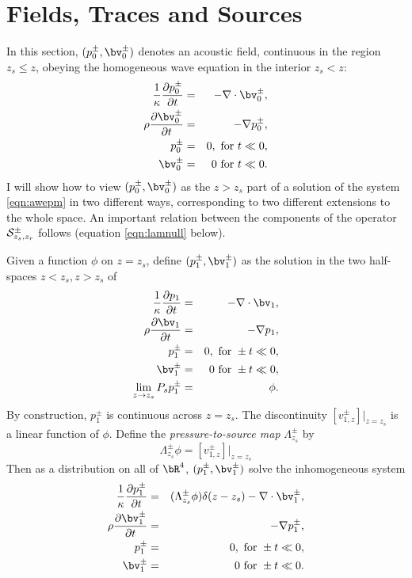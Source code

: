 \section{Fields, Traces and Sources}
In this section, $(p^{\pm}_0,\bv^{\pm}_0)$ denotes an acoustic field,
continuous in the region $z_s \le z $, obeying the homogeneous wave
equation in the interior $z_s < z $:
\begin{eqnarray}
\label{eqn:awe1}
  \frac{1}{\kappa}\frac{\partial p^{\pm}_0}{\partial t} & = & - \nabla \cdot \bv^{\pm}_0, \nonumber \\
  \rho\frac{\partial \bv^{\pm}_0}{\partial t} & = & - \nabla
                                                    p^{\pm}_0, \nonumber \\
  p^{\pm}_0 & =& 0,  \mbox{ for } t \ll 0, \nonumber\\ 
  \bv^{\pm}_0 & = & 0 \mbox{ for } t \ll 0.
\end{eqnarray}
I will show how to view $(p^{\pm}_0,\bv^{\pm}_0)$ as the $z>z_s$ part
of a solution of the system \ref{eqn:awepm} in two different ways,
corresponding to two different extensions to the whole space. An
important relation between the components of the operator
${\cal S}^{\pm}_{z_s,z_r}$ follows (equation \ref{eqn:lamnull} below).

Given a function $\phi$ on $z=z_s$, define $(p^{\pm}_1,\bv^{\pm}_1)$
as the solution in the two half-spaces $z <z_s, z>z_s$ of
\begin{eqnarray}
\label{eqn:awe1}
  \frac{1}{\kappa}\frac{\partial p_1}{\partial t} & = & - \nabla \cdot \bv_1, \nonumber \\
  \rho\frac{\partial \bv_1}{\partial t} & = & - \nabla p_1,\nonumber \\
  p^{\pm}_1 & =& 0,  \mbox{ for } \pm t \ll 0,\nonumber\\ 
  \bv^{\pm}_1 & = & 0 \mbox{ for } \pm t \ll 0,\nonumber\\
  \lim_{z \rightarrow z_s} P_sp^{\pm}_1& =& \phi.
\end{eqnarray}
By construction, $p^{\pm}_1$ is continuous across $z=z_s$. The
discontinuity $[v^{\pm}_{1,z}]|_{z=z_s}$ is a linear function of
$\phi$. Define the {\em pressure-to-source map} $\Lambda^{\pm}_{z_s}$ by
\begin{equation}
  \label{eqn:deflam}
  \Lambda^{\pm}_{z_s}\phi = [v^{\pm}_{1,z}]|_{z=z_s}
\end{equation}
Then as a distribution on all of $\bR^4$, $(p^{\pm}_1,\bv^{\pm}_1)$ solve the
inhomogeneous system
\begin{eqnarray}
\label{eqn:sawe1}
  \frac{1}{\kappa}\frac{\partial p^{\pm}_1}{\partial t} & = &
                                                        (\Lambda^{\pm}_{z_s}\phi)\delta(z-z_s) - \nabla \cdot \bv^{\pm}_1, \nonumber \\
  \rho\frac{\partial \bv^{\pm}_1}{\partial t} & = & - \nabla p^{\pm}_1,\nonumber \\
  p^{\pm}_1 & =& 0,  \mbox{ for } \pm t \ll 0,\nonumber\\ 
  \bv^{\pm}_1 & = & 0 \mbox{ for } \pm t \ll 0.
\end{eqnarray}

